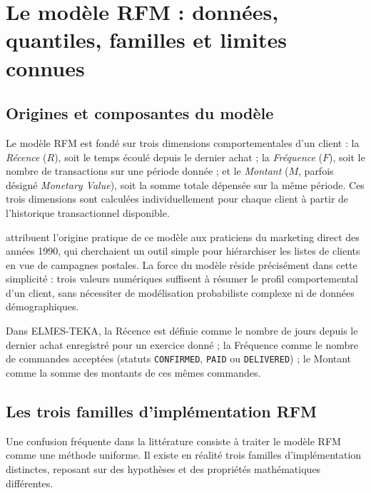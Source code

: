 \section{Le modèle RFM : données, quantiles, familles et limites connues}
\label{sec:revue-rfm}

\subsection{Origines et composantes du modèle}
\label{subsec:revue-rfm-origines}

Le modèle RFM est fondé sur trois dimensions comportementales d'un client :
la \emph{Récence} ($R$), soit le temps écoulé depuis le dernier achat ; la
\emph{Fréquence} ($F$), soit le nombre de transactions sur une période donnée ; et le
\emph{Montant} ($M$, parfois désigné \emph{Monetary Value}), soit la somme totale dépensée
sur la même période. Ces trois dimensions sont calculées individuellement pour chaque client
à partir de l'historique transactionnel disponible.

\citet{Fader2005} attribuent l'origine pratique de ce modèle aux praticiens du marketing
direct des années 1990, qui cherchaient un outil simple pour hiérarchiser les listes de
clients en vue de campagnes postales. La force du modèle réside précisément dans cette
simplicité : trois valeurs numériques suffisent à résumer le profil comportemental d'un
client, sans nécessiter de modélisation probabiliste complexe ni de données démographiques.

Dans ELMES-TEKA, la Récence est définie comme le nombre de jours depuis le dernier achat
enregistré pour un exercice donné ; la Fréquence comme le nombre de commandes acceptées
(statuts \texttt{CONFIRMED}, \texttt{PAID} ou \texttt{DELIVERED}) ; le Montant comme la
somme des montants de ces mêmes commandes.

\subsection{Les trois familles d'implémentation RFM}
\label{subsec:revue-rfm-familles}

Une confusion fréquente dans la littérature consiste à traiter le modèle RFM comme une
méthode uniforme. Il existe en réalité trois familles d'implémentation distinctes, reposant
sur des hypothèses et des propriétés mathématiques différentes.

